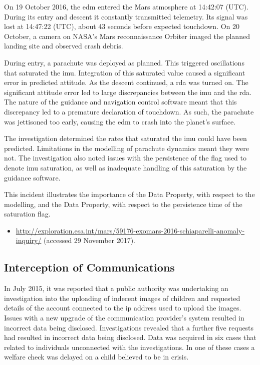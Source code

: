 On 19 October 2016, the \gls{edm} entered the Mars atmosphere at 14:42:07 (UTC). During its entry and descent it constantly transmitted telemetry. Its signal was lost at 14:47:22 (UTC), about 43 seconds before expected touchdown. On 20 October, a camera on NASA's Mars reconnaissance Orbiter imaged the planned landing site and observed crash debris.

During entry, a parachute was deployed as planned. This triggered oscillations that saturated the \gls{imu}. Integration of this saturated value caused a significant error in predicted attitude. As the descent continued, a \gls{rda} was turned on. The significant attitude error led to large discrepancies between the \gls{imu} and the \gls{rda}. The nature of the guidance and navigation control software meant that this discrepancy led to a premature declaration of touchdown. As such, the parachute was jettisoned too early, causing the \gls{edm} to crash into the planet's surface.

The investigation determined the rates that saturated the \gls{imu} could have been predicted. Limitations in the modelling of parachute dynamics meant they were not. The investigation also noted issues with the persistence of the flag used to denote \gls{imu} saturation, as well as inadequate handling of this saturation by the guidance software.

This incident illustrates the importance of the  Data Property, with respect to the modelling, and the  Data Property, with respect to the persistence time of the saturation flag.

\begin{samepage}
\begin{itemize}
	\item \raggedright{\href{http://exploration.esa.int/mars/59176-exomars-2016-schiaparelli-anomaly-inquiry/}{http://exploration.esa.int/mars/59176-exomars-2016-schiaparelli-anomaly-inquiry/} (accessed 29 November 2017).}
\end{itemize}
\end{samepage}


\subsection{Interception of Communications} \label{bkm:incacc:comintercept}
In July 2015, it was reported that a public authority was undertaking an investigation into the uploading of indecent images of children and requested details of the account connected to the \gls{ip} address used to upload the images. Issues with a new upgrade of the communication provider's system resulted in incorrect data being disclosed. Investigations revealed that a further five requests had resulted in incorrect data being disclosed. Data was acquired in six cases that related to individuals unconnected with the investigations. In one of these cases a welfare check was delayed on a child believed to be in crisis.

